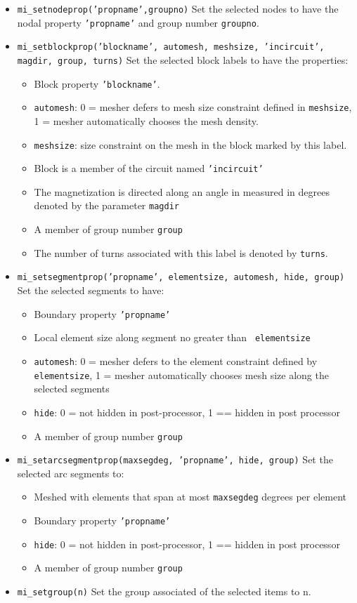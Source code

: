 \begin{itemize}
\item{\tt mi\_setnodeprop('propname',groupno)} Set the selected nodes to
have the nodal property {\tt 'propname'} and group number {\tt groupno}.

\item{\tt mi\_setblockprop('blockname', automesh, meshsize, 'incircuit',
magdir, group, turns)} Set the selected block labels to have the
properties:
\begin{itemize}
\item Block property {\tt 'blockname'}.
\item {\tt automesh}: 0 = mesher defers to mesh size constraint defined in {\tt meshsize},
         1 = mesher automatically chooses the mesh density.
\item {\tt meshsize}: size constraint on the mesh in the block marked by this label.
\item Block is a member of the circuit named {\tt 'incircuit'}
\item The magnetization is directed along an angle in measured in degrees denoted by the parameter
        {\tt magdir}
\item A member of group number {\tt group}
\item The number of turns associated with this label is denoted by {\tt turns}.
\end{itemize}

\item{\tt mi\_setsegmentprop('propname', elementsize, automesh, hide,
group)} Set the selected segments to have:
\begin{itemize}
\item Boundary property {\tt 'propname'}
\item Local element size along segment no greater than {\tt
elementsize}
\item {\tt automesh}:  0 = mesher defers to the element constraint defined by {\tt elementsize},
        1 = mesher automatically chooses mesh size along the selected segments
\item {\tt hide}: 0 =  not hidden in post-processor, 1 == hidden in post processor
\item A member of group number {\tt group}
\end{itemize}

\item{\tt mi\_setarcsegmentprop(maxsegdeg, 'propname', hide, group)} Set the
selected arc segments to:
\begin{itemize}
\item Meshed with elements that span at most {\tt maxsegdeg} degrees per
element
\item Boundary property {\tt 'propname'}
\item {\tt hide}: 0 =  not hidden in post-processor, 1 == hidden in post processor
\item A member of group number {\tt group}
\end{itemize}

\item{\tt mi\_setgroup(n)} Set the group associated of the selected items to n.

\end{itemize}

